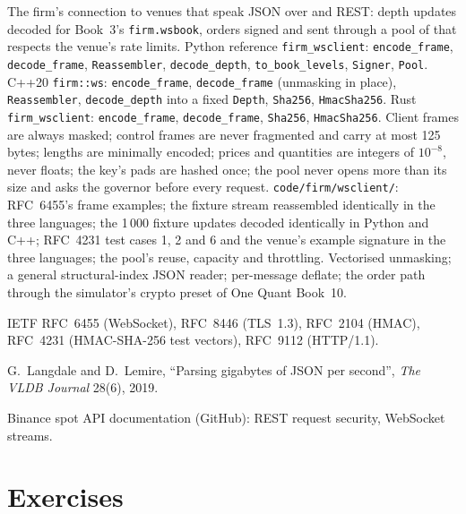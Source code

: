 \begin{build}
 The firm's connection to venues that speak JSON over  and REST: depth updates decoded for Book~3's
\texttt{firm.wsbook}, orders signed and sent through a pool of  that respects the venue's rate limits.
 Python reference \texttt{firm\_wsclient}: \texttt{encode\_frame}, \texttt{decode\_frame},
\texttt{Reassembler}, \texttt{decode\_depth}, \texttt{to\_book\_levels}, \texttt{Signer}, \texttt{Pool}. C++20
\texttt{firm::ws}: \texttt{encode\_frame}, \texttt{decode\_frame} (unmasking in place), \texttt{Reassembler},
\texttt{decode\_depth} into a fixed \texttt{Depth}, \texttt{Sha256}, \texttt{HmacSha256}. Rust \texttt{firm\_wsclient}:
\texttt{encode\_frame}, \texttt{decode\_frame}, \texttt{Sha256}, \texttt{HmacSha256}.
 Client frames are always masked; control frames are never fragmented and carry at most 125 bytes; lengths are
minimally encoded; prices and quantities are integers of $10^{-8}$, never floats; the key's pads are hashed once; the pool
never opens more than its size and asks the governor before every request.
 \texttt{code/firm/wsclient/}: RFC~6455's frame examples; the fixture stream reassembled identically
in the three languages; the 1\,000 fixture updates decoded identically in Python and C++; RFC~4231 test cases 1, 2 and 6 and
the venue's example signature in the three languages; the pool's reuse, capacity and throttling.
 Vectorised unmasking; a general structural-index JSON reader; per-message deflate; the order path through
the simulator's crypto preset of One Quant Book~10.
\end{build}

\begin{omsources}
\item IETF RFC~6455 (WebSocket), RFC~8446 (TLS~1.3), RFC~2104 (HMAC), RFC~4231 (HMAC-SHA-256 test vectors), RFC~9112
(HTTP/1.1).
\item G.~Langdale and D.~Lemire, ``Parsing gigabytes of JSON per second'', \emph{The VLDB Journal} 28(6), 2019.
\item Binance spot API documentation (GitHub): REST request security, WebSocket streams.
\end{omsources}

\section{Exercises}


